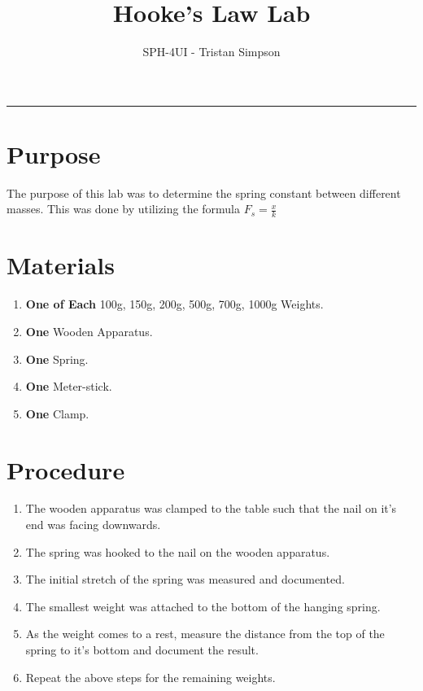 \documentclass{article}
\title{Hooke's Law Lab}
\author{SPH-4UI - Tristan Simpson}
\begin{document}
\maketitle

\vspace{0.5cm}
\hrule
\vspace{0.5cm}
\section*{Purpose}
The purpose of this lab was to determine the spring constant between different masses.
This was done by utilizing the formula $F_{s} = \frac{x}{k}$

\section*{Materials}
\begin{enumerate}
    \item {\textbf{One of Each} 100g, 150g, 200g, 500g, 700g, 1000g Weights.}
    \item {\textbf{One} Wooden Apparatus.}
    \item {\textbf{One} Spring.}
    \item {\textbf{One} Meter-stick.}
    \item {\textbf{One} Clamp.}
\end{enumerate}

\section*{Procedure}
\begin{enumerate}
    \item {The wooden apparatus was clamped to the table such that the nail on it's end was facing downwards.}
    \item {The spring was hooked to the nail on the wooden apparatus.}
    \item {The initial stretch of the spring was measured and documented.}
    \item {The smallest weight was attached to the bottom of the hanging spring.}
    \item {As the weight comes to a rest, measure the distance from the top of the spring to it's bottom and document the result.}
    \item {Repeat the above steps for the remaining weights.}
\end{enumerate}\leavevmode
\end{document}
